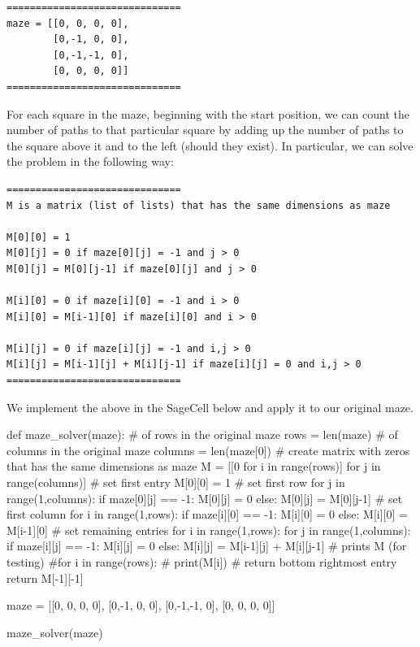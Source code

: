 \documentclass{ximera}
\begin{document}
\begin{verbatim}
==============================
maze = [[0, 0, 0, 0],
        [0,-1, 0, 0],
        [0,-1,-1, 0],
        [0, 0, 0, 0]]
==============================
\end{verbatim}

For each square in the maze, beginning with the start position, we can count the number of paths to that particular square by adding up the number of paths to the square above it and to the left (should they exist). In particular, we can solve the problem in the following way:
\begin{verbatim}
==============================
M is a matrix (list of lists) that has the same dimensions as maze

M[0][0] = 1
M[0][j] = 0 if maze[0][j] = -1 and j > 0
M[0][j] = M[0][j-1] if maze[0][j] and j > 0

M[i][0] = 0 if maze[i][0] = -1 and i > 0
M[i][0] = M[i-1][0] if maze[i][0] and i > 0

M[i][j] = 0 if maze[i][j] = -1 and i,j > 0
M[i][j] = M[i-1][j] + M[i][j-1] if maze[i][j] = 0 and i,j > 0
==============================
\end{verbatim}

We implement the above in the SageCell below and apply it to our original maze.
\begin{sageCell}
def maze_solver(maze):
        # of rows in the original maze
        rows = len(maze)
        # of columns in the original maze
        columns = len(maze[0])
        # create matrix with zeros that has the same dimensions as maze
        M = [[0 for i in range(rows)] for j in range(columns)]
        # set first entry
        M[0][0] = 1
        # set first row
        for j in range(1,columns):
                if maze[0][j] == -1:
                        M[0][j] = 0
                else:
                        M[0][j] = M[0][j-1]
        # set first column
        for i in range(1,rows):
                if maze[i][0] == -1:
                        M[i][0] = 0
                else:
                        M[i][0] = M[i-1][0]
        # set remaining entries
        for i in range(1,rows):
                for j in range(1,columns):
                        if maze[i][j] == -1:
                                M[i][j] = 0
                        else:
                                M[i][j] = M[i-1][j] + M[i][j-1]
        # prints M (for testing)
        #for i in range(rows):
        #    print(M[i])
        # return bottom rightmost entry
        return M[-1][-1]

maze = [[0, 0, 0, 0],
        [0,-1, 0, 0],
        [0,-1,-1, 0],
        [0, 0, 0, 0]]

maze_solver(maze)
\end{sageCell}
\end{document}

